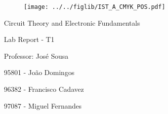 \documentclass[11pt]{article}
\begin{document}
\thispagestyle{empty}
\begin{figure}[h]
	\centering
	\texttt{[image: ../../figlib/IST\_A\_CMYK\_POS.pdf]}
\end{figure}

\begin{center}
	\huge{Circuit Theory and Electronic Fundamentals}
	
	\huge{Lab Report - T1}
	
	\vspace{30pt}
	
	\large{Professor: José Sousa}
	
	\vspace{20pt}
	
	\large{95801 - João Domingos}
	
	\large{96382 - Francisco Cadavez}
	
	\large{97087 - Miguel Fernandes}
\end{center}

\pagebreak

\tableofcontents

\pagebreak

\end{document}
